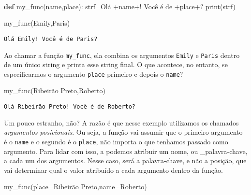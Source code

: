 \documentclass[
  brazilian,
  letterpaper,
  DIV=11,
  numbers=noendperiod]{scrreprt}
\newenvironment{Shaded}{\begin{snugshade}}{\end{snugshade}}
\newcommand{\BuiltInTok}[1]{\textcolor[rgb]{0.00,0.23,0.31}{#1}}
\newcommand{\KeywordTok}[1]{\textcolor[rgb]{0.00,0.23,0.31}{\textbf{#1}}}
\newcommand{\NormalTok}[1]{\textcolor[rgb]{0.00,0.23,0.31}{#1}}
\newcommand{\OperatorTok}[1]{\textcolor[rgb]{0.37,0.37,0.37}{#1}}
\newcommand{\StringTok}[1]{\textcolor[rgb]{0.13,0.47,0.30}{#1}}
\begin{document}
\begin{Shaded}
\begin{Highlighting}[]
\KeywordTok{def}\NormalTok{ my\_func(name,place):}
\NormalTok{    strf}\OperatorTok{=}\StringTok{\textquotesingle{}Olá \textquotesingle{}}\OperatorTok{+}\NormalTok{name}\OperatorTok{+}\StringTok{\textquotesingle{}! Você é de \textquotesingle{}}\OperatorTok{+}\NormalTok{place}\OperatorTok{+}\StringTok{\textquotesingle{}?\textquotesingle{}}
    \BuiltInTok{print}\NormalTok{(strf)}

\NormalTok{my\_func(}\StringTok{\textquotesingle{}Emily\textquotesingle{}}\NormalTok{,}\StringTok{\textquotesingle{}Paris\textquotesingle{}}\NormalTok{)}
\end{Highlighting}
\end{Shaded}

\begin{verbatim}
Olá Emily! Você é de Paris?
\end{verbatim}

Ao chamar a função \texttt{my\_func}, ela combina os argumentos
\texttt{Emily} e \texttt{Paris} dentro de um único string e printa esse
string final. O que acontece, no entanto, se especificarmos o argumento
\texttt{place} primeiro e depois o \texttt{name}?

\begin{Shaded}
\begin{Highlighting}[]
\NormalTok{my\_func(}\StringTok{\textquotesingle{}Ribeirão Preto\textquotesingle{}}\NormalTok{,}\StringTok{\textquotesingle{}Roberto\textquotesingle{}}\NormalTok{)}
\end{Highlighting}
\end{Shaded}

\begin{verbatim}
Olá Ribeirão Preto! Você é de Roberto?
\end{verbatim}

Um pouco estranho, não? A razão é que nesse exemplo utilizamos os
chamados \emph{argumentos posicionais}. Ou seja, a função vai assumir
que o primeiro argumento é o \texttt{name} e o segundo é o
\texttt{place}, não importa o que tenhamos passado como argumento. Para
lidar com isso, a podemos atribuir um nome, ou \_palavra-chave, a cada
um dos argumentos. Nesse caso, será a palavra-chave, e não a posição,
que vai determinar qual o valor atribuído a cada argumento dentro da
função.

\begin{Shaded}
\begin{Highlighting}[]
\NormalTok{my\_func(place}\OperatorTok{=}\StringTok{\textquotesingle{}Ribeirão Preto\textquotesingle{}}\NormalTok{,name}\OperatorTok{=}\StringTok{\textquotesingle{}Roberto\textquotesingle{}}\NormalTok{)}
\end{Highlighting}
\end{Shaded}
\end{document}
